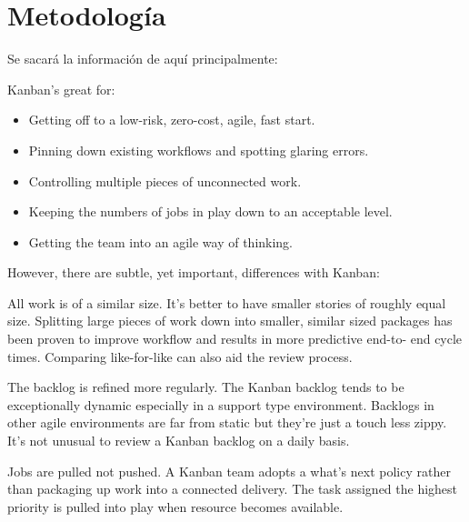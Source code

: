 \section{Metodología}\label{sec:metodologia}


Se sacará la información de aquí principalmente:
\cite{Cole2015-fd} %
\cite{Stellman2014-qr} %

Kanban's great for:
\begin{itemize}
    \item Getting off to a low-risk, zero-cost, agile, fast start.
    \item Pinning down existing workflows and spotting glaring errors.
    \item Controlling multiple pieces of unconnected work.
    \item Keeping the numbers of jobs in play down to an acceptable level.
    \item Getting the team into an agile way of thinking.
\end{itemize}

However,
there are subtle, yet important, differences with Kanban:

All work is of a similar size. It's better to have smaller
stories of roughly equal size. Splitting large pieces of work
down into smaller, similar sized packages has been proven
to improve workflow and results in more predictive end-to-
end cycle times. Comparing like-for-like can also aid the
review process.

The backlog is refined more regularly. The Kanban
backlog tends to be exceptionally dynamic especially
in a support type environment. Backlogs in other agile
environments are far from static but they're just a touch
less zippy. It's not unusual to review a Kanban backlog on a
daily basis.

Jobs are pulled not pushed. A Kanban team adopts a
what's next policy rather than packaging up work into a
connected delivery. The task assigned the highest priority is
pulled into play when resource becomes available.

